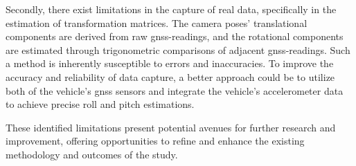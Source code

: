 Secondly, there exist limitations in the capture of real data, specifically in the estimation of transformation matrices. The camera poses' translational components are derived from raw \acrshort{gnss}-readings, and the rotational components are estimated through trigonometric comparisons of adjacent \acrshort{gnss}-readings. Such a method is inherently susceptible to errors and inaccuracies. To improve the accuracy and reliability of data capture, a better approach could be to utilize both of the vehicle's \acrshort{gnss} sensors and integrate the vehicle's accelerometer data to achieve precise roll and pitch estimations.

These identified limitations present potential avenues for further research and improvement, offering opportunities to refine and enhance the existing methodology and outcomes of the study.
